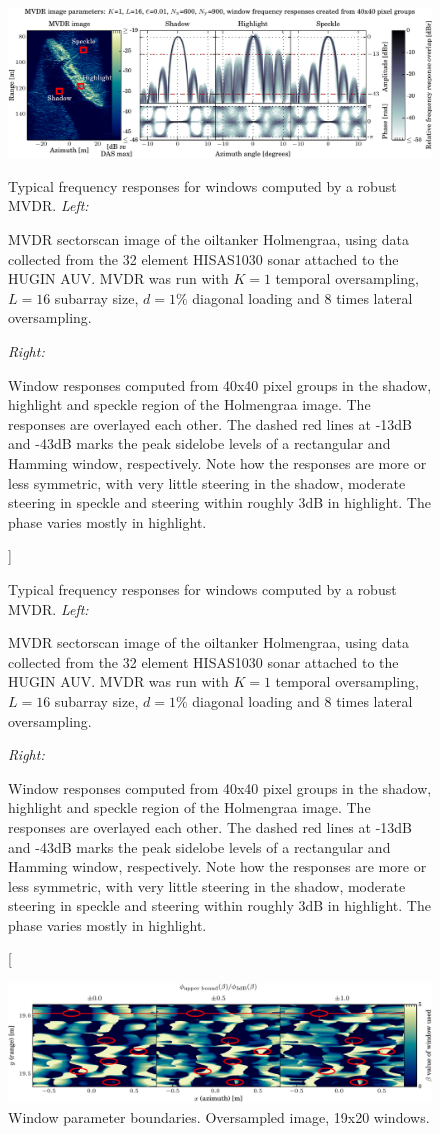 \documentclass[10pt,journal,draftclsnofoot,onecolumn]{IEEEtran}
\let\MYoriglatexcaption\caption               %
\renewcommand{\caption}[2][\relax]{\MYoriglatexcaption[#2]{#2}}
\newcommand\1{\vec 1}
\begin{document}
\begin{figure}[t]\centering%
\includegraphics[width=\linewidth]{gfx/mvdr_selected_windows_holmengraa.pdf}%
\caption{Typical frequency responses for windows computed by a robust MVDR.\newline
\emph{Left:}\hfill
\parbox[t]{.95\linewidth}{MVDR sectorscan image of the oiltanker Holmengraa, using data collected from the 32 element HISAS1030 sonar attached to the HUGIN AUV. MVDR was run with $K=1$ temporal oversampling, $L=16$ subarray size, $d=1\%$ diagonal loading and 8 times lateral oversampling.}\newline
\emph{Right:}\hfill
\parbox[t]{.95\linewidth}{Window responses computed from 40x40 pixel groups in the shadow, highlight and speckle region of the Holmengraa image. The responses are overlayed each other. The dashed red lines at -13dB and -43dB marks the peak sidelobe levels of a rectangular and Hamming window, respectively. Note how the responses are more or less symmetric, with very little steering in the shadow, moderate steering in speckle and steering within roughly 3dB in highlight. The phase varies mostly in highlight.} }\label{mvdr_selected_windows}
\end{figure}

\begin{figure}[t]%
\includegraphics[width=\textwidth]{gfx/oversampling_mosaic_bounds_lca_windows_beta.pdf}%
\caption{Window parameter boundaries. Oversampled image, 19x20 windows.}\label{oversampling_mosaic_bounds_beta}
\end{figure}
\end{document}
